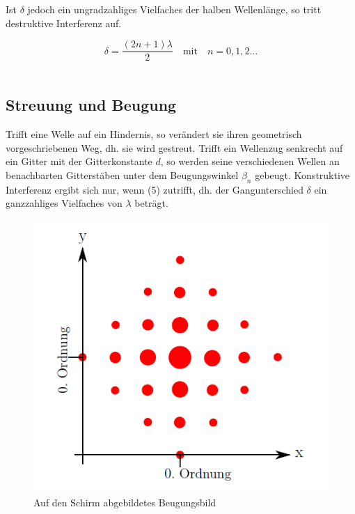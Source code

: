 \documentclass[12pt,a4paper,titlepage,headinclude,bibtotoc]{scrartcl}
\begin{document}
Ist $\delta$ jedoch ein ungradzahliges Vielfaches der halben Wellenlänge, so tritt destruktive Interferenz auf. \\
\par
\begin{equation}
\delta = \frac{(2n+1)\lambda}{2} \quad \mathrm{mit}\quad  n=0,1,2...
\end{equation}
\\
\par


\subsection{Streuung und Beugung}
Trifft eine Welle auf ein Hindernis, so verändert sie ihren geometrisch vorgeschriebenen Weg, dh. sie wird gestreut. %
Trifft ein Wellenzug senkrecht auf ein Gitter mit der Gitterkonstante $d$, so werden seine verschiedenen Wellen an benachbarten Gitterstäben unter dem Beugungswinkel $\beta_n$ gebeugt. Konstruktive Interferenz ergibt sich nur, wenn (5) zutrifft, dh. der Gangunterschied $\delta$ ein ganzzahliges Vielfaches von $\lambda$ beträgt.

\begin{figure} [h]
\begin{center}
\includegraphics[scale=0.5]{Beugungsbild.png} \end{center}
\caption{Auf den Schirm abgebildetes Beugungsbild}
\end{figure}
\end{document}
